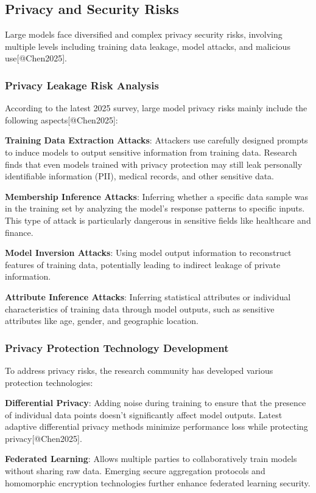 \documentclass{article}
\begin{document}
\subsection{Privacy and Security Risks}
Large models face diversified and complex privacy security risks, involving multiple levels including training data leakage, model attacks, and malicious use[@Chen2025].

\subsubsection{Privacy Leakage Risk Analysis}
According to the latest 2025 survey, large model privacy risks mainly include the following aspects[@Chen2025]:

\textbf{Training Data Extraction Attacks}: Attackers use carefully designed prompts to induce models to output sensitive information from training data. Research finds that even models trained with privacy protection may still leak personally identifiable information (PII), medical records, and other sensitive data.

\textbf{Membership Inference Attacks}: Inferring whether a specific data sample was in the training set by analyzing the model's response patterns to specific inputs. This type of attack is particularly dangerous in sensitive fields like healthcare and finance.

\textbf{Model Inversion Attacks}: Using model output information to reconstruct features of training data, potentially leading to indirect leakage of private information.

\textbf{Attribute Inference Attacks}: Inferring statistical attributes or individual characteristics of training data through model outputs, such as sensitive attributes like age, gender, and geographic location.

\subsubsection{Privacy Protection Technology Development}
To address privacy risks, the research community has developed various protection technologies:

\textbf{Differential Privacy}: Adding noise during training to ensure that the presence of individual data points doesn't significantly affect model outputs. Latest adaptive differential privacy methods minimize performance loss while protecting privacy[@Chen2025].

\textbf{Federated Learning}: Allows multiple parties to collaboratively train models without sharing raw data. Emerging secure aggregation protocols and homomorphic encryption technologies further enhance federated learning security.
\end{document}
